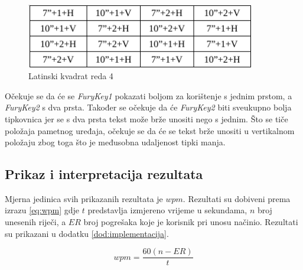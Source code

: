 \documentclass[times, utf8, zavrsni, numeric]{fer}
\begin{document}
\begin{figure}[htb]
\centering
\includegraphics[width=10cm]{img/lat.png}
\caption{Latinski kvadrat reda 4}
\label{fig:lat}
\end{figure}

Očekuje se da će se \emph{FuryKey1} pokazati boljom za korištenje s jednim prstom, a \emph{FuryKey2} s dva prsta. Također se očekuje da će \emph{FuryKey2} biti sveukupno bolja tipkovnica jer se s dva prsta tekst može brže unositi nego s jednim. Što se tiče položaja pametnog uređaja, očekuje se da će se tekst brže unositi u vertikalnom položaju zbog toga što je međusobna udaljenost tipki manja.

\subsection{Prikaz i interpretacija rezultata}
Mjerna jedinica svih prikazanih rezultata je $wpm$. Rezultati su dobiveni prema izrazu \ref{eq:wpm} gdje $t$ predstavlja izmjereno vrijeme u sekundama, $n$ broj unesenih riječi, a $ER$ broj pogrešaka koje je korisnik pri unosu načinio. Rezultati su prikazani u dodatku \ref{dod:implementacija}.

\begin{equation}
\label{eq:wpm}
wpm = \frac{60(n-ER)}{t}
\end{equation}
\end{document}
